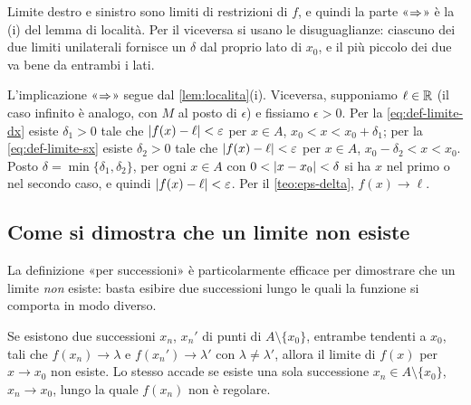 \begin{schema}
\end{schema}

\begin{strategia}
Limite destro e sinistro sono limiti di restrizioni di $f$, e quindi la parte
«$\Rightarrow$» è la (i) del lemma di località. Per il viceversa si usano le disuguaglianze:
ciascuno dei due limiti unilaterali fornisce un $\delta$ dal proprio lato di $x_{0}$, e il
più piccolo dei due va bene da entrambi i lati.
\end{strategia}

\begin{dimostrazione}
L'implicazione «$\Rightarrow$» segue dal \cref{lem:localita}(i). Viceversa, supponiamo
$\ell\in\mathbb{R}$ (il caso infinito è analogo, con $M$ al posto di $\epsilon$) e fissiamo
$\epsilon>0$. Per la \eqref{eq:def-limite-dx} esiste $\delta_{1}>0$ tale che
$\lvert f(x)-\ell\rvert<\varepsilon$ per $x\in A$, $x_{0}<x<x_{0}+\delta_{1}$; per la
\eqref{eq:def-limite-sx} esiste $\delta_{2}>0$ tale che $\lvert f(x)-\ell\rvert<\varepsilon$ per
$x\in A$, $x_{0}-\delta_{2}<x<x_{0}$. Posto $\delta=\min\{\delta_{1},\delta_{2}\}$, per ogni
$x\in A$ con $0<\lvert x-x_{0}\rvert<\delta$ si ha $x$ nel primo o nel secondo caso, e quindi
$\lvert f(x)-\ell\rvert<\varepsilon$. Per il \cref{teo:eps-delta}, $f(x)\to\ell$.
\end{dimostrazione}

\subsection{Come si dimostra che un limite non esiste}

La definizione «per successioni» è particolarmente efficace per dimostrare che un limite
\emph{non} esiste: basta esibire due successioni lungo le quali la funzione si comporta
in modo diverso.

\begin{corollario}\label{cor:non-esistenza}
Se esistono due successioni $x_{n}$, $x_{n}'$ di punti di $A\setminus\{x_{0}\}$, entrambe
tendenti a $x_{0}$, tali che $f(x_{n})\to\lambda$ e $f(x_{n}')\to\lambda'$ con
$\lambda\neq\lambda'$, allora il limite di $f(x)$ per $x\to x_{0}$ non esiste. Lo stesso
accade se esiste una sola successione $x_{n}\in A\setminus\{x_{0}\}$, $x_{n}\to x_{0}$,
lungo la quale $f(x_{n})$ non è regolare.
\end{corollario}

